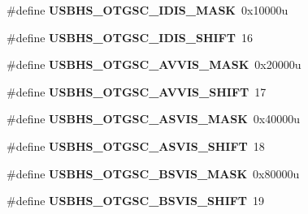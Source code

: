 \begin{DoxyCompactItemize}
\item 
\hypertarget{group___u_s_b_h_s___register___masks_ga37d6596133cf09b98e1073cd15c66530}{}\#define {\bfseries U\+S\+B\+H\+S\+\_\+\+O\+T\+G\+S\+C\+\_\+\+I\+D\+I\+S\+\_\+\+M\+A\+S\+K}~0x10000u\label{group___u_s_b_h_s___register___masks_ga37d6596133cf09b98e1073cd15c66530}

\item 
\hypertarget{group___u_s_b_h_s___register___masks_gaa99ba5e5f0fa5f18896d507a4d355352}{}\#define {\bfseries U\+S\+B\+H\+S\+\_\+\+O\+T\+G\+S\+C\+\_\+\+I\+D\+I\+S\+\_\+\+S\+H\+I\+F\+T}~16\label{group___u_s_b_h_s___register___masks_gaa99ba5e5f0fa5f18896d507a4d355352}

\item 
\hypertarget{group___u_s_b_h_s___register___masks_gac984984860249b9eb313aead2d3206e2}{}\#define {\bfseries U\+S\+B\+H\+S\+\_\+\+O\+T\+G\+S\+C\+\_\+\+A\+V\+V\+I\+S\+\_\+\+M\+A\+S\+K}~0x20000u\label{group___u_s_b_h_s___register___masks_gac984984860249b9eb313aead2d3206e2}

\item 
\hypertarget{group___u_s_b_h_s___register___masks_ga6f8191f1690c67be16e630deaef4a8dd}{}\#define {\bfseries U\+S\+B\+H\+S\+\_\+\+O\+T\+G\+S\+C\+\_\+\+A\+V\+V\+I\+S\+\_\+\+S\+H\+I\+F\+T}~17\label{group___u_s_b_h_s___register___masks_ga6f8191f1690c67be16e630deaef4a8dd}

\item 
\hypertarget{group___u_s_b_h_s___register___masks_ga008783b2b17017bde91a383c5076e5ee}{}\#define {\bfseries U\+S\+B\+H\+S\+\_\+\+O\+T\+G\+S\+C\+\_\+\+A\+S\+V\+I\+S\+\_\+\+M\+A\+S\+K}~0x40000u\label{group___u_s_b_h_s___register___masks_ga008783b2b17017bde91a383c5076e5ee}

\item 
\hypertarget{group___u_s_b_h_s___register___masks_gaa894ebf283b421686f905a8c01cdb857}{}\#define {\bfseries U\+S\+B\+H\+S\+\_\+\+O\+T\+G\+S\+C\+\_\+\+A\+S\+V\+I\+S\+\_\+\+S\+H\+I\+F\+T}~18\label{group___u_s_b_h_s___register___masks_gaa894ebf283b421686f905a8c01cdb857}

\item 
\hypertarget{group___u_s_b_h_s___register___masks_ga70f98f0fed66dde7f0a084333f1051c1}{}\#define {\bfseries U\+S\+B\+H\+S\+\_\+\+O\+T\+G\+S\+C\+\_\+\+B\+S\+V\+I\+S\+\_\+\+M\+A\+S\+K}~0x80000u\label{group___u_s_b_h_s___register___masks_ga70f98f0fed66dde7f0a084333f1051c1}

\item 
\hypertarget{group___u_s_b_h_s___register___masks_ga1dfca7df3387604a924c04d873708acb}{}\#define {\bfseries U\+S\+B\+H\+S\+\_\+\+O\+T\+G\+S\+C\+\_\+\+B\+S\+V\+I\+S\+\_\+\+S\+H\+I\+F\+T}~19\label{group___u_s_b_h_s___register___masks_ga1dfca7df3387604a924c04d873708acb}


\end{DoxyCompactItemize}
